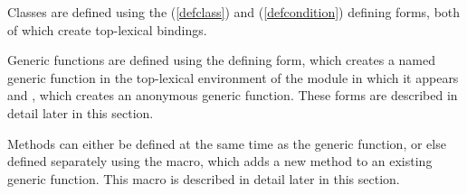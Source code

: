 \begin{optDefinition}
Classes are defined using the  (\ref{defclass}) and
 (\ref{defcondition}) defining forms, both of which
create top-lexical bindings.

Generic functions are defined using the
 defining form, which creates a named
generic function in the top-lexical environment of the module in which it
appears and , which creates an
anonymous generic function.  These forms are described in detail later in this
section.

Methods can either be defined at the same time as the generic function, or else
defined separately using the  macro, which adds a new method
to an existing generic function.  This macro is described in detail later in
this section.
%
\end{optDefinition}

